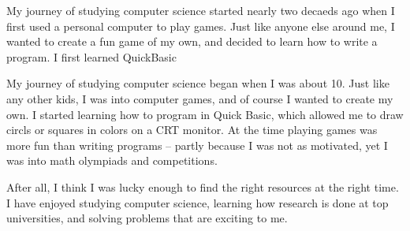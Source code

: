 
My journey of studying computer science started nearly two decaeds ago when I first used a personal computer to play games. Just like anyone else around me, I wanted to create a fun game of my own, and decided to learn how to write a program. I first learned QuickBasic 



My journey of studying computer science began when I was about 10.
Just like any other kids, I was into computer games, and of course I wanted to create my own. 
I started learning how to program in Quick Basic, which allowed me to draw circls or squares in colors on a CRT monitor.
At the time playing games was more fun than writing programs -- partly because I was not as motivated, yet I was into math olympiads and competitions.




After all, I think I was lucky enough to find the right resources at the right time.  I have enjoyed studying computer science, learning how research is done at top universities, and solving problems that are exciting to me.


